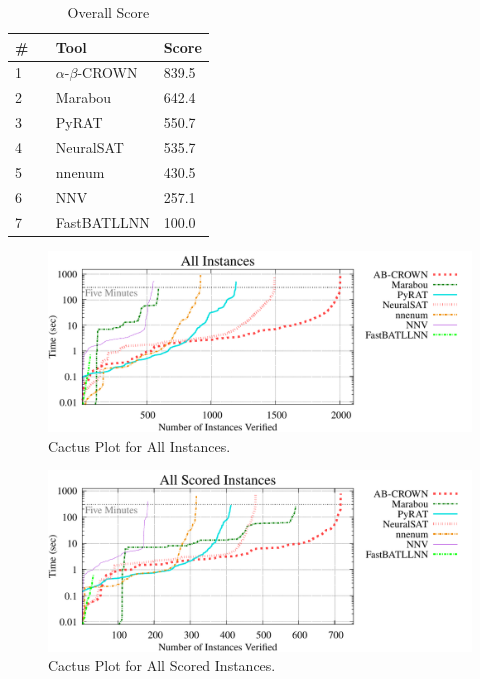 

\begin{table}[h]
\begin{center}
\caption{Overall Score} \label{tab:score}
{\setlength{\tabcolsep}{2pt}
\begin{tabular}[h]{@{}lll@{}}
\toprule
\textbf{\# ~} & \textbf{Tool} & \textbf{Score}\\
\midrule
1 & $\alpha$-$\beta$-CROWN & 839.5 \\
2 & Marabou & 642.4 \\
3 & PyRAT & 550.7 \\
4 & NeuralSAT & 535.7 \\
5 & nnenum & 430.5 \\
6 & NNV & 257.1 \\
7 & FastBATLLNN & 100.0 \\
\bottomrule
\end{tabular}
}
\end{center}
\end{table}



\begin{figure}[h]
\centerline{\includegraphics[width=\textwidth]{cactus/all.pdf}}
\caption{Cactus Plot for All Instances.}
\label{fig:quantPic}
\end{figure}


\begin{figure}[h]
\centerline{\includegraphics[width=\textwidth]{cactus/all_scored.pdf}}
\caption{Cactus Plot for All Scored Instances.}
\label{fig:quantPic}
\end{figure}

